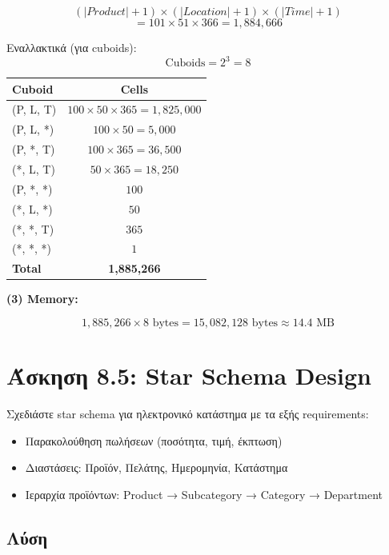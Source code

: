$$(|Product| + 1) \times (|Location| + 1) \times (|Time| + 1)$$
$$= 101 \times 51 \times 366 = 1,884,666$$

Εναλλακτικά (για cuboids):
$$\text{Cuboids} = 2^3 = 8$$

\begin{center}
\begin{tabular}{lc}
\toprule
\textbf{Cuboid} & \textbf{Cells} \\
\midrule
(P, L, T) & $100 \times 50 \times 365 = 1,825,000$ \\
(P, L, *) & $100 \times 50 = 5,000$ \\
(P, *, T) & $100 \times 365 = 36,500$ \\
(*, L, T) & $50 \times 365 = 18,250$ \\
(P, *, *) & $100$ \\
(*, L, *) & $50$ \\
(*, *, T) & $365$ \\
(*, *, *) & $1$ \\
\midrule
\textbf{Total} & \textbf{1,885,266} \\
\bottomrule
\end{tabular}
\end{center}

\textbf{(3) Memory:}

$$1,885,266 \times 8 \text{ bytes} = 15,082,128 \text{ bytes} \approx 14.4 \text{ MB}$$

\section{Άσκηση 8.5: Star Schema Design}

\begin{formulabox}[Εκφώνηση]
Σχεδιάστε star schema για ηλεκτρονικό κατάστημα με τα εξής requirements:
\begin{itemize}
    \item Παρακολούθηση πωλήσεων (ποσότητα, τιμή, έκπτωση)
    \item Διαστάσεις: Προϊόν, Πελάτης, Ημερομηνία, Κατάστημα
    \item Ιεραρχία προϊόντων: Product → Subcategory → Category → Department
\end{itemize}
\end{formulabox}

\subsection*{Λύση}

